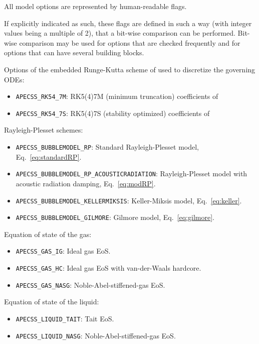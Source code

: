 All model options are represented by human-readable flags. 

If explicitly indicated as such, these flags are defined in such a way (with integer values being a multiple of 2), that a bit-wise comparison can be performed. Bit-wise comparison may be used for options that are checked frequently and for options that can have several building blocks.

Options of the embedded Runge-Kutta scheme of \citet{Dormand1980} used to discretize the governing ODEs:\vspace{-1em}
\begin{itemize}[noitemsep]
  \item {\tt APECSS\_RK54\_7M}: RK5(4)7M (minimum truncation) coefficients of \citet{Dormand1980}
  \item {\tt APECSS\_RK54\_7S}: RK5(4)7S (stability optimized) coefficients of \citet{Dormand1980}
\end{itemize}

Rayleigh-Plesset schemes:\vspace{-1em}
\begin{itemize}[noitemsep]
  \item {\tt APECSS\_BUBBLEMODEL\_RP}: Standard Rayleigh-Plesset model, Eq.~\eqref{eq:standardRP}.
  \item {\tt APECSS\_BUBBLEMODEL\_RP\_ACOUSTICRADIATION}: Rayleigh-Plesset model with acoustic radiation damping, Eq.~\eqref{eq:modRP}.
  \item {\tt APECSS\_BUBBLEMODEL\_KELLERMIKSIS}: Keller-Miksis model, Eq.~\eqref{eq:keller}.
  \item {\tt APECSS\_BUBBLEMODEL\_GILMORE}: Gilmore model, Eq.~\eqref{eq:gilmore}.
\end{itemize}

Equation of state of the gas:\vspace{-1em}
\begin{itemize}[noitemsep]
  \item {\tt APECSS\_GAS\_IG}: Ideal gas EoS.
  \item {\tt APECSS\_GAS\_HC}: Ideal gas EoS with van-der-Waals hardcore.
  \item {\tt APECSS\_GAS\_NASG}: Noble-Abel-stiffened-gas EoS.
\end{itemize}

Equation of state of the liquid:\vspace{-1em}
\begin{itemize}[noitemsep]
  \item {\tt APECSS\_LIQUID\_TAIT}: Tait EoS.
  \item {\tt APECSS\_LIQUID\_NASG}: Noble-Abel-stiffened-gas EoS.
\end{itemize}

